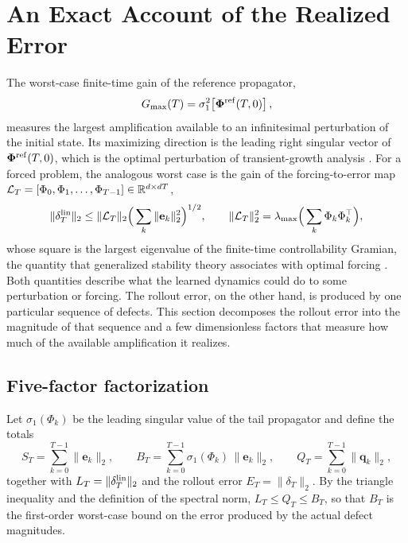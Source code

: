 \section{An Exact Account of the Realized Error}
\label{sec:accounting}

The worst-case finite-time gain of the reference propagator,
\begin{equation}
  G_{\max}(T)=\sigma_1^2\!\left[\boldsymbol{\Phi}^{\rm ref}(T,0)\right],
  \label{eq:gmax}
\end{equation}
measures the largest amplification available to an infinitesimal perturbation of the initial state. Its maximizing direction is the leading right singular vector of $\boldsymbol{\Phi}^{\rm ref}(T,0)$, which is the optimal perturbation of transient-growth analysis \citep{reddy1993,schmid2007}. For a forced problem, the analogous worst case is the gain of the forcing-to-error map $\mathcal L_T=[\Phi_0,\Phi_1,\ldots,\Phi_{T-1}]\in\mathbb{R}^{d\times dT}$,
\begin{equation}
  \|\delta^{\rm lin}_T\|_2\le\|\mathcal L_T\|_2\Big(\sum_k\|\mathbf e_k\|_2^2\Big)^{1/2},
  \qquad
  \|\mathcal L_T\|_2^2=\lambda_{\max}\Big(\sum_k\Phi_k\Phi_k^\top\Big),
  \label{eq:forced_gain}
\end{equation}
whose square is the largest eigenvalue of the finite-time controllability Gramian, the quantity that generalized stability theory associates with optimal forcing \citep{farrell1996b}. Both quantities describe what the learned dynamics could do to some perturbation or forcing. The rollout error, on the other hand, is produced by one particular sequence of defects. This section decomposes the rollout error into the magnitude of that sequence and a few dimensionless factors that measure how much of the available amplification it realizes.

\subsection{Five-factor factorization}

Let $\sigma_1(\Phi_k)$ be the leading singular value of the tail propagator and define the totals
\begin{equation}
  S_T=\sum_{k=0}^{T-1}\|\mathbf e_k\|_2,
  \qquad
  B_T=\sum_{k=0}^{T-1}\sigma_1(\Phi_k)\,\|\mathbf e_k\|_2,
  \qquad
  Q_T=\sum_{k=0}^{T-1}\|\mathbf q_k\|_2,
  \label{eq:totals}
\end{equation}
together with $L_T=\|\delta^{\rm lin}_T\|_2$ and the rollout error $E_T=\|\delta_T\|_2$. By the triangle inequality and the definition of the spectral norm, $L_T\le Q_T\le B_T$, so that $B_T$ is the first-order worst-case bound on the error produced by the actual defect magnitudes.


